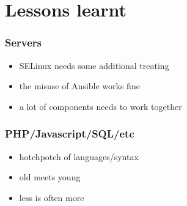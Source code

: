 \section{Lessons learnt}
%
\begin{frame}
\frametitle{Servers}
%
\begin{itemize}
  \item SELinux needs some additional treating
  \item the misuse of Ansible works fine
  \item a lot of components needs to work together
\end{itemize}
\end{frame}
%
\begin{frame}
\frametitle{PHP/Javascript/SQL/etc}
%
\begin{itemize}
  \item hotchpotch of languages/syntax
  \item old meets young
  \item less is often more
\end{itemize}
\end{frame}
